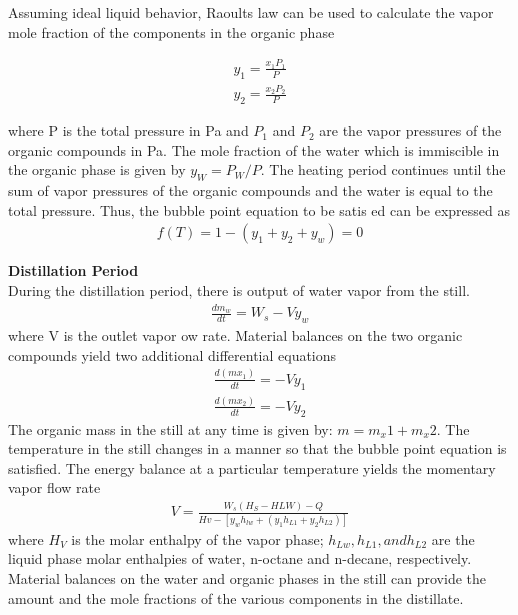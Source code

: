 \documentclass[12pt]{report}
\begin{document}
Assuming ideal liquid behavior, Raoults law can be used to calculate the vapor mole fraction of the components in the organic phase

\begin{gather*}
y_1 = \frac{x_1P_1}{P} \\
y_2 = \frac{x_2P_2}{P}
\end{gather*}

where P is the total pressure in Pa and $P_1$ and $P_2$ are the vapor pressures of the organic compounds in Pa. The mole fraction of the water which is immiscible in the organic phase is given by $y_W=P_W/P$. The heating period continues until the sum of vapor pressures of the organic compounds and the water is equal to the total pressure. Thus, the bubble point equation to be satis ed can be expressed as
\begin{gather*}
f(T) = 1 - (y_1+y_2+y_w) = 0
\end{gather*}

\textbf{Distillation Period} \\
During the distillation period, there is output of water vapor from the still. 
\begin{gather*}
\frac{dm_w}{dt} = W_s - Vy_w
\end{gather*}
where V is the outlet vapor  ow rate. Material balances on the two organic compounds yield two additional differential equations
\begin{gather*}
\frac{d(mx_1)}{dt} = -Vy_1 \\
\frac{d(mx_2)}{dt} = -Vy_2
\end{gather*}
The organic mass in the still at any time is given by: $m = m_x1 + m_x2$. The temperature in the still changes in a manner so that the bubble point equation is satisfied. The energy balance at a particular temperature yields the momentary vapor flow rate
\begin{gather*}
V = \frac{W_s(H_S-H{LW}) - Q}{Hv-[y_wh_{lw}+(y_1h_{L1}+y_2h_{L2})]}
\end{gather*}
where $H_V$ is the molar enthalpy of the vapor phase; $h_{Lw}, h_{L1}, and h_{L2}$ are the liquid phase molar enthalpies of water, n-octane and n-decane, respectively. Material balances on the water and organic phases in the still can provide the amount and the mole fractions of the various components in the distillate.
\end{document}
